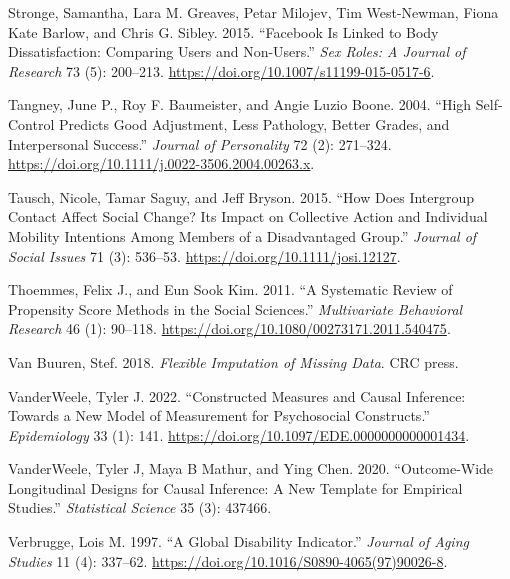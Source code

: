 \documentclass[
  singlecolumn]{report}
\newlength{\cslhangindent}
\newlength{\cslentryspacingunit} %
\newenvironment{CSLReferences}[2] %
 {%
  \setlength{\parindent}{0pt}
  \ifodd #1
  \let\oldpar\par
  \def\par{\hangindent=\cslhangindent\oldpar}
  \fi
  \setlength{\parskip}{#2\cslentryspacingunit}
 }%
 {}
\begin{document}
\begin{CSLReferences}{1}{0}
\leavevmode{}%
Stronge, Samantha, Lara M. Greaves, Petar Milojev, Tim West-Newman,
Fiona Kate Barlow, and Chris G. Sibley. 2015. {``Facebook Is Linked to
Body Dissatisfaction: Comparing Users and Non-Users.''} \emph{Sex Roles:
A Journal of Research} 73 (5): 200--213.
\url{https://doi.org/10.1007/s11199-015-0517-6}.

\leavevmode{}%
Tangney, June P., Roy F. Baumeister, and Angie Luzio Boone. 2004.
{``High Self-Control Predicts Good Adjustment, Less Pathology, Better
Grades, and Interpersonal Success.''} \emph{Journal of Personality} 72
(2): 271--324. \url{https://doi.org/10.1111/j.0022-3506.2004.00263.x}.

\leavevmode{}%
Tausch, Nicole, Tamar Saguy, and Jeff Bryson. 2015. {``How Does
Intergroup Contact Affect Social Change? Its Impact on Collective Action
and Individual Mobility Intentions Among Members of a Disadvantaged
Group.''} \emph{Journal of Social Issues} 71 (3): 536--53.
\url{https://doi.org/10.1111/josi.12127}.

\leavevmode{}%
Thoemmes, Felix J., and Eun Sook Kim. 2011. {``A Systematic Review of
Propensity Score Methods in the Social Sciences.''} \emph{Multivariate
Behavioral Research} 46 (1): 90--118.
\url{https://doi.org/10.1080/00273171.2011.540475}.

\leavevmode{}%
Van Buuren, Stef. 2018. \emph{Flexible Imputation of Missing Data}. CRC
press.

\leavevmode{}%
VanderWeele, Tyler J. 2022. {``Constructed Measures and Causal
Inference: Towards a New Model of Measurement for Psychosocial
Constructs.''} \emph{Epidemiology} 33 (1): 141.
\url{https://doi.org/10.1097/EDE.0000000000001434}.

\leavevmode{}%
VanderWeele, Tyler J, Maya B Mathur, and Ying Chen. 2020.
{``Outcome-Wide Longitudinal Designs for Causal Inference: A New
Template for Empirical Studies.''} \emph{Statistical Science} 35 (3):
437466.

\leavevmode{}%
Verbrugge, Lois M. 1997. {``A Global Disability Indicator.''}
\emph{Journal of Aging Studies} 11 (4): 337--62.
\url{https://doi.org/10.1016/S0890-4065(97)90026-8}.


\end{CSLReferences}
\end{document}
